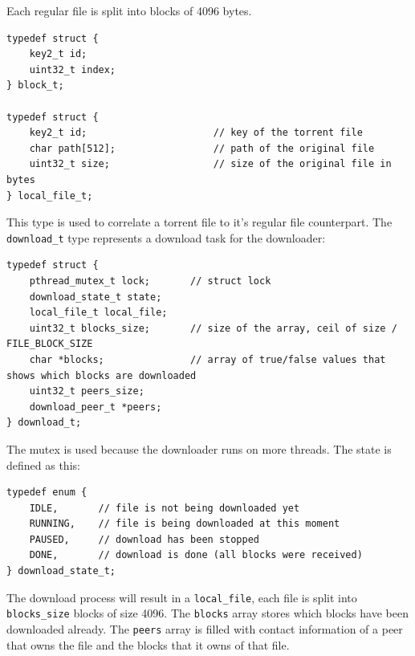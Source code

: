 \documentclass[runningheads]{llncs}
\begin{document}
Each regular file is split into blocks of 4096 bytes.
\begin{lstlisting}
typedef struct {
    key2_t id;
    uint32_t index;
} block_t;

typedef struct {
    key2_t id;                      // key of the torrent file
    char path[512];                 // path of the original file
    uint32_t size;                  // size of the original file in bytes
} local_file_t;
\end{lstlisting}
This type is used to correlate a torrent file to it's regular file counterpart.
The \verb|download_t| type represents a download task for the downloader:
\begin{lstlisting}
typedef struct {
    pthread_mutex_t lock;       // struct lock
    download_state_t state;
    local_file_t local_file;
    uint32_t blocks_size;       // size of the array, ceil of size / FILE_BLOCK_SIZE
    char *blocks;               // array of true/false values that shows which blocks are downloaded
    uint32_t peers_size;
    download_peer_t *peers;
} download_t;
\end{lstlisting}
The mutex is used because the downloader runs on more threads. The state is defined as this:
\begin{lstlisting}
typedef enum {
    IDLE,       // file is not being downloaded yet
    RUNNING,    // file is being downloaded at this moment
    PAUSED,     // download has been stopped
    DONE,       // download is done (all blocks were received)
} download_state_t;
\end{lstlisting}
The download process will result in a \verb|local_file|, each file is split into \verb|blocks_size| blocks of size 4096. The \verb|blocks| array stores which blocks have been downloaded already. The \verb|peers| array is filled with contact information of a peer that owns the file and the blocks that it owns of that file.
\end{document}
